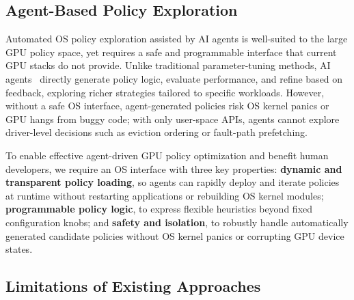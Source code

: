 
\subsection{Agent-Based Policy Exploration}
\label{sec:motivation-agent}

Automated OS policy exploration assisted by AI agents is well-suited to the large GPU policy space, yet requires a safe and programmable interface that current GPU stacks do not provide. Unlike traditional parameter-tuning methods, AI agents~\cite{dwivedula2025policysmith,zheng2025schedcp} directly generate policy logic, evaluate performance, and refine based on feedback, exploring richer strategies tailored to specific workloads. However, without a safe OS interface, agent-generated policies risk OS kernel panics or GPU hangs from buggy code; with only user-space APIs, agents cannot explore driver-level decisions such as eviction ordering or fault-path prefetching.

To enable effective agent-driven GPU policy optimization and benefit human developers, we require an OS interface with three key properties: \textbf{dynamic and transparent policy loading}, so agents can rapidly deploy and iterate policies at runtime without restarting applications or rebuilding OS kernel modules; \textbf{programmable policy logic}, to express flexible heuristics beyond fixed configuration knobs; and \textbf{safety and isolation}, to robustly handle automatically generated candidate policies without OS kernel panics or corrupting GPU device states. %

\subsection{Limitations of Existing Approaches}
\label{sec:motivation-limitations}

